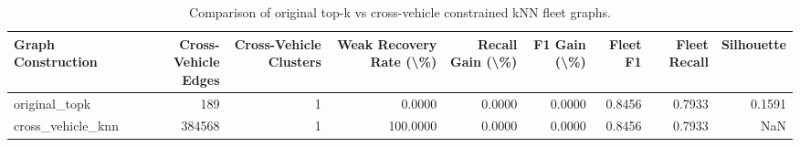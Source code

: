 \begin{table}[t]
\centering
\begin{tabular}{lrrrrrrrr}
\toprule
Graph Construction & Cross-Vehicle Edges & Cross-Vehicle Clusters & Weak Recovery Rate (\textbackslash \%) & Recall Gain (\textbackslash \%) & F1 Gain (\textbackslash \%) & Fleet F1 & Fleet Recall & Silhouette \\
\midrule
original\_topk & 189 & 1 & 0.0000 & 0.0000 & 0.0000 & 0.8456 & 0.7933 & 0.1591 \\
cross\_vehicle\_knn & 384568 & 1 & 100.0000 & 0.0000 & 0.0000 & 0.8456 & 0.7933 & NaN \\
\bottomrule
\end{tabular}
\caption{Comparison of original top-k vs cross-vehicle constrained kNN fleet graphs.}
\label{tab:graph-construction-comparison}
\end{table}
